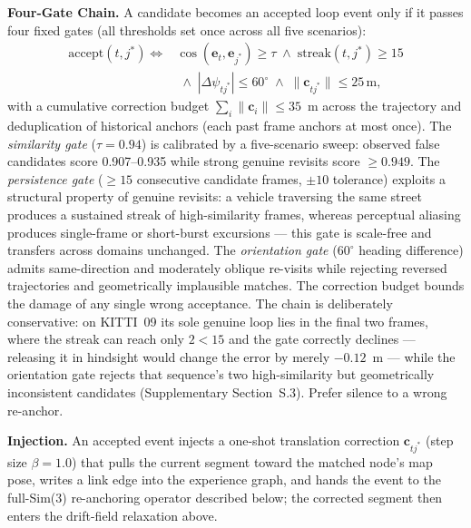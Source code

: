 \textbf{Four-Gate Chain.} A candidate becomes an accepted loop event only if it passes four fixed gates (all thresholds set once across all five scenarios):
\begin{align}
    \mathrm{accept}(t, j^{*}) \iff{}
    & \cos(\mathbf{e}_t, \mathbf{e}_{j^{*}}) \ge \tau
    \;\wedge\; \mathrm{streak}(t, j^{*}) \ge 15 \nonumber\\
    &\;\wedge\; |\Delta\psi_{t j^{*}}| \le 60^{\circ}
    \;\wedge\; \lVert \mathbf{c}_{t j^{*}} \rVert \le 25\,\mathrm{m},
    \label{eq:pr_gates}
\end{align}
with a cumulative correction budget $\sum_i \lVert \mathbf{c}_i \rVert \le 35$~m across the trajectory and deduplication of historical anchors (each past frame anchors at most once). The \emph{similarity gate} ($\tau = 0.94$) is calibrated by a five-scenario sweep: observed false candidates score 0.907--0.935 while strong genuine revisits score $\ge 0.949$. The \emph{persistence gate} ($\ge 15$ consecutive candidate frames, $\pm 10$ tolerance) exploits a structural property of genuine revisits: a vehicle traversing the same street produces a sustained streak of high-similarity frames, whereas perceptual aliasing produces single-frame or short-burst excursions --- this gate is scale-free and transfers across domains unchanged. The \emph{orientation gate} ($60^{\circ}$ heading difference) admits same-direction and moderately oblique re-visits while rejecting reversed trajectories and geometrically implausible matches. The correction budget bounds the damage of any single wrong acceptance. The chain is deliberately conservative: on KITTI~09 its sole genuine loop lies in the final two frames, where the streak can reach only $2 < 15$ and the gate correctly declines --- releasing it in hindsight would change the error by merely $-0.12$~m --- while the orientation gate rejects that sequence's two high-similarity but geometrically inconsistent candidates (Supplementary Section~S.3). Prefer silence to a wrong re-anchor.

\textbf{Injection.} An accepted event injects a one-shot translation correction $\mathbf{c}_{t j^{*}}$ (step size $\beta = 1.0$) that pulls the current segment toward the matched node's map pose, writes a link edge into the experience graph, and hands the event to the full-Sim(3) re-anchoring operator described below; the corrected segment then enters the drift-field relaxation above.

